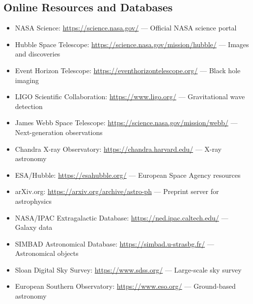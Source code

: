 \documentclass[11pt,a4paper]{article}
\begin{document}
\subsection{Online Resources and Databases}
\begin{itemize}[noitemsep]
    \item NASA Science: \url{https://science.nasa.gov/} --- Official NASA science portal
    \item Hubble Space Telescope: \url{https://science.nasa.gov/mission/hubble/} --- Images and discoveries
    \item Event Horizon Telescope: \url{https://eventhorizontelescope.org/} --- Black hole imaging
    \item LIGO Scientific Collaboration: \url{https://www.ligo.org/} --- Gravitational wave detection
    \item James Webb Space Telescope: \url{https://science.nasa.gov/mission/webb/} --- Next-generation observations
    \item Chandra X-ray Observatory: \url{https://chandra.harvard.edu/} --- X-ray astronomy
    \item ESA/Hubble: \url{https://esahubble.org/} --- European Space Agency resources
    \item arXiv.org: \url{https://arxiv.org/archive/astro-ph} --- Preprint server for astrophysics
    \item NASA/IPAC Extragalactic Database: \url{https://ned.ipac.caltech.edu/} --- Galaxy data
    \item SIMBAD Astronomical Database: \url{https://simbad.u-strasbg.fr/} --- Astronomical objects
    \item Sloan Digital Sky Survey: \url{https://www.sdss.org/} --- Large-scale sky survey
    \item European Southern Observatory: \url{https://www.eso.org/} --- Ground-based astronomy
\end{itemize}
\end{document}
